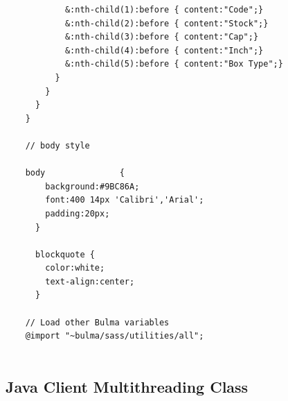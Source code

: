 \documentclass[12pt]{article}
\begin{document}
\begin{verbatim}
			&:nth-child(1):before { content:"Code";}
			&:nth-child(2):before { content:"Stock";}
			&:nth-child(3):before { content:"Cap";}
			&:nth-child(4):before { content:"Inch";}
			&:nth-child(5):before { content:"Box Type";}
		  }        
		}
	  }
	}
	
	// body style
	
	body               { 
		background:#9BC86A; 
		font:400 14px 'Calibri','Arial';
		padding:20px;
	  }
	  
	  blockquote {
		color:white;
		text-align:center;
	  }
	
	// Load other Bulma variables
	@import "~bulma/sass/utilities/all";
	
\end{verbatim}

\subsection{Java Client Multithreading Class}
\end{document}
